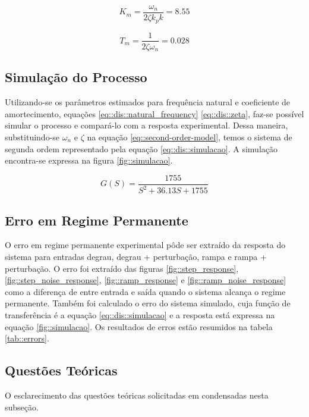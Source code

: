 \begin{equation}
K_m = \frac{\omega_n}{2 \zeta k_p k } = 8.55 
\label{eq::dis::km}
\end{equation}

\begin{equation}
T_m = \frac{1}{2 \zeta \omega_n} = 0.028 
\label{eq::dis::tm}
\end{equation}



\subsection{Simulação do Processo}

Utilizando-se os parâmetros estimados para frequência natural e coeficiente de amortecimento, equações \ref{eq::dis::natural_frequency} \ref{eq::dis::zeta}, faz-se possível simular o processo e compará-lo com a resposta experimental. Dessa maneira, substituindo-se $\omega_n$ e $\zeta$ na equação \ref{eq::second-order-model}, temos o sistema de segunda ordem representado pela equação \ref{eq::dis::simulacao}. A simulação encontra-se expressa na figura \ref{fig::simulacao}.

\begin{equation}
G(S) = \frac{1755}{S^2 + 36.13 S + 1755}
\label{eq::dis::simulacao}
\end{equation}

\subsection{Erro em Regime Permanente}

O erro em regime permanente experimental pôde ser extraído da resposta do sistema para entradas degrau, degrau + perturbação, rampa e rampa + perturbação. O erro foi extraído das figuras \ref{fig::step_response}, \ref{fig::step_noise_response}, \ref{fig::ramp_response} e \ref{fig::ramp_noise_response} como a diferença de entre entrada e saída quando o sistema alcança o regime permanente. Também foi calculado o erro do sistema simulado, cuja função de transferência é a equação \ref{eq::dis::simulacao} e a resposta está expressa na equação \ref{fig::simulacao}. Os resultados de erros estão resumidos na tabela \ref{tab::errors}.



\subsection{Questões Teóricas}
O esclarecimento das questões teóricas solicitadas em \cite{CDIN:Roteiro1} condensadas nesta subseção.

